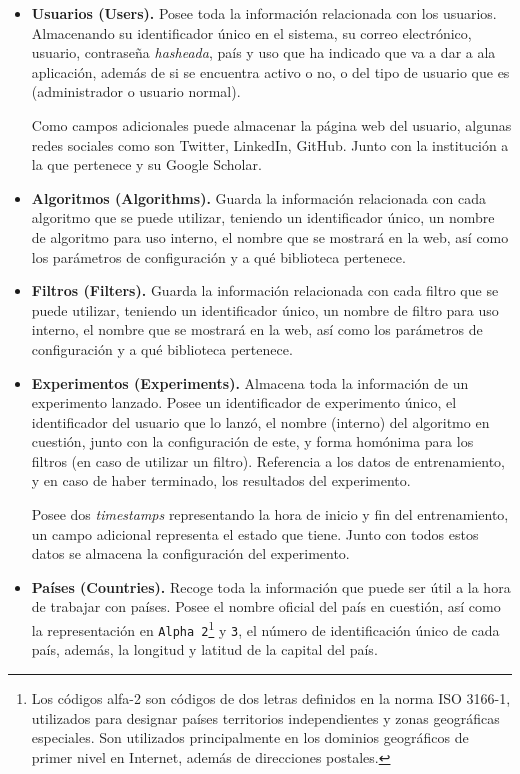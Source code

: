 \begin{itemize}
\item \textbf{Usuarios (Users).} Posee toda la información relacionada con los usuarios. Almacenando su identificador único en el sistema, su correo electrónico, usuario, contraseña \textit{hasheada}, país y uso que ha indicado que va a dar a ala aplicación, además de si se encuentra activo o no, o del tipo de usuario que es (administrador o usuario normal). 

Como campos adicionales puede almacenar la página web del usuario, algunas redes sociales como son Twitter, LinkedIn, GitHub. Junto con la institución a la que pertenece y su Google Scholar.

\item \textbf{Algoritmos (Algorithms).} Guarda la información relacionada con cada algoritmo que se puede utilizar, teniendo un identificador único, un nombre de algoritmo para uso interno, el nombre que se mostrará en la web, así como los parámetros de configuración y a qué biblioteca pertenece.

\item \textbf{Filtros (Filters).} Guarda la información relacionada con cada filtro que se puede utilizar, teniendo un identificador único, un nombre de filtro para uso interno, el nombre que se mostrará en la web, así como los parámetros de configuración y a qué biblioteca pertenece.

\item \textbf{Experimentos (Experiments).} Almacena toda la información de un experimento lanzado. Posee un identificador de experimento único, el identificador del usuario que lo lanzó, el nombre (interno) del algoritmo en cuestión, junto con la configuración de este, y forma homónima para los filtros (en caso de utilizar un filtro).  Referencia a los datos de entrenamiento, y en caso de haber terminado, los resultados del experimento. 

Posee dos \textit{timestamps} representando la hora de inicio y fin del entrenamiento, un campo adicional representa el estado que tiene. Junto con todos estos datos se almacena la configuración del experimento.

\item \textbf{Países (Countries).} Recoge toda la información que puede ser útil a la hora de trabajar con países. Posee el nombre oficial del país en cuestión, así como la representación en \texttt{Alpha 2}\footnote{Los códigos alfa-2 son códigos de dos letras definidos en la norma ISO 3166-1, utilizados para designar países territorios independientes y zonas geográficas especiales. Son utilizados principalmente en los dominios geográficos de primer nivel en Internet, además de direcciones postales.} y \texttt{3}, el número de identificación único de cada país, además, la longitud y latitud de la capital del país. 
\end{itemize}

